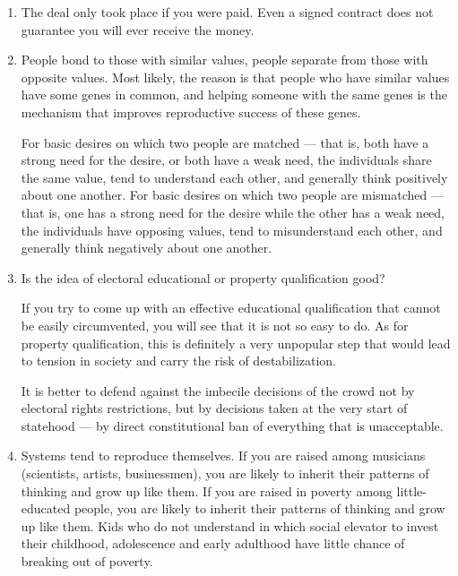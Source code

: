 \documentclass[11pt]{article}
\theoremstyle{remark}
\theoremstyle{definition}
\begin{document}
\begin{enumerate}
\item The deal only took place if you were paid. Even a signed contract does not guarantee you will ever receive the money.

\item People bond to those with similar values, people separate from those with opposite values. Most likely, the reason is that people who have similar values have some genes in common, and helping someone with the same genes is the mechanism that improves reproductive success of these genes. 

For basic desires on which two people are matched --- that is, both have a strong need for the desire, or both have a weak need, the individuals share the same value, tend to understand each other, and generally think positively about one another. For basic desires on which two people are mismatched --- that is, one has a strong need for the desire while the other has a weak need, the individuals have opposing values, tend to misunderstand each other, and generally think negatively about one another.

\item Is the idea of electoral educational or property qualification good?



If you try to come up with an effective educational qualification that cannot be easily circumvented, you will see that it is not so easy to do. As for property qualification, this is definitely a very unpopular step that would lead to tension in society and carry the risk of destabilization.

It is better to defend against the imbecile decisions of the crowd not by electoral rights restrictions, but by decisions taken at the very start of statehood --- by direct constitutional ban of everything that is unacceptable.






\item Systems tend to reproduce themselves. If you are raised among musicians (scientists, artists, businessmen), you are likely to inherit their patterns of thinking and grow up like them. If you are raised in poverty among little-educated people, you are likely to inherit their patterns of thinking and grow up like them. Kids who do not understand in which social elevator to invest their childhood, adolescence and early adulthood have little chance of breaking out of poverty.


\end{enumerate}
\end{document}
